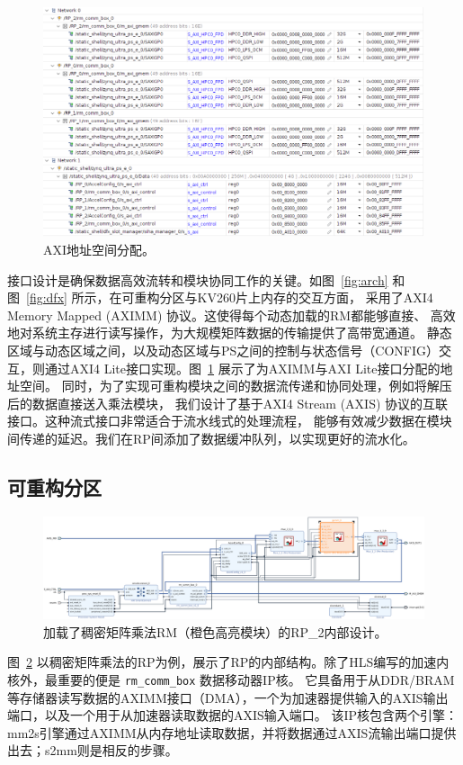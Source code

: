 \begin{figure}[htbp]
\centerline{\includegraphics[width=0.8\columnwidth]{figures/mem.png}}
\caption{AXI地址空间分配。}
\label{fig:network}
\end{figure}

接口设计是确保数据高效流转和模块协同工作的关键。如图~\ref{fig:arch} 和图~\ref{fig:dfx} 所示，在可重构分区与KV260片上内存的交互方面，
采用了AXI4 Memory Mapped (AXIMM) 协议。这使得每个动态加载的RM都能够直接、
高效地对系统主存进行读写操作，为大规模矩阵数据的传输提供了高带宽通道。
静态区域与动态区域之间，以及动态区域与PS之间的控制与状态信号（CONFIG）交互，则通过AXI4 Lite接口实现。图~\ref{fig:network} 展示了为AXIMM与AXI Lite接口分配的地址空间。
同时，为了实现可重构模块之间的数据流传递和协同处理，例如将解压后的数据直接送入乘法模块，
我们设计了基于AXI4 Stream (AXIS) 协议的互联接口。这种流式接口非常适合于流水线式的处理流程，
能够有效减少数据在模块间传递的延迟。我们在RP间添加了数据缓冲队列，以实现更好的流水化。

\subsection{可重构分区}

\begin{figure}[htbp]
\centerline{\includegraphics[width=\columnwidth]{figures/rp2.png}}
\caption{加载了稠密矩阵乘法RM（橙色高亮模块）的RP\_2内部设计。}
\label{fig:rp}
\end{figure}

图~\ref{fig:rp} 以稠密矩阵乘法的RP为例，展示了RP的内部结构。除了HLS编写的加速内核外，最重要的便是 \verb|rm_comm_box| 数据移动器IP核。
它具备用于从DDR/BRAM等存储器读写数据的AXIMM接口（DMA），一个为加速器提供输入的AXIS输出端口，以及一个用于从加速器读取数据的AXIS输入端口。
该IP核包含两个引擎：mm2s引擎通过AXIMM从内存地址读取数据，并将数据通过AXIS流输出端口提供出去；s2mm则是相反的步骤。

